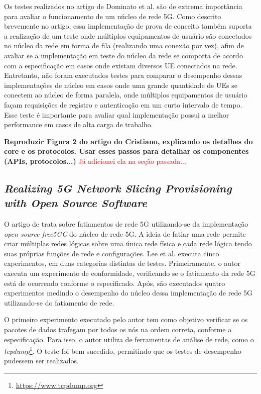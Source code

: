 Os testes realizados no artigo de Dominato et al. são de extrema importância para avaliar o funcionamento de um núcleo de rede 5G.
Como descrito brevemente no artigo, essa implementação de prova de conceito também suporta a realização de um teste onde múltiplos equipamentos de usuário são conectados no núcleo da rede em forma de fila (realizando uma conexão por vez), afim de avaliar se a implementação em teste do núcleo da rede se comporta de acordo com a especificação em casos onde existam diversos UE conectados na rede.
Entretanto, não foram executados testes para comparar o desempenho dessas implementações de núcleo em casos onde uma grande quantidade de UEs se conectem ao núcleo de forma paralela, onde múltiplos equipamentos de usuário façam requisições de registro e autenticação em um curto intervalo de tempo.
Esse teste é importante para avaliar qual implementação possui a melhor performance em casos de alta carga de trabalho.


\textbf{Reproduzir Figura 2 do artigo do Cristiano, explicando os detalhes do core e os protocolos. Usar esses passos para detalhar os componentes (APIs, protocolos...)} \textcolor{red}{Já adicionei ela na seção passada...}

\subsection{\textit{Realizing 5G Network Slicing Provisioning with Open Source Software}}

O artigo de \cite{Lee2021} trata sobre fatiamentos de rede 5G utilizando-se da implementação \textit{open source free5GC} do núcleo de rede 5G.
A ideia de fatiar uma rede permite criar múltiplas redes lógicas sobre uma única rede física e cada rede lógica tendo suas próprias funções de rede e configurações.
Lee et al. executa cinco experimentos, em duas categorias distintas de testes. Primeiramente, o autor executa um experimento de conformidade, verificando se o fatiamento da rede 5G está de ocorrendo conforme o especificado. Após, são executados quatro experimentos medindo o desempenho do núcleo dessa implementação de rede 5G utilizando-se do fatiamento de rede.

O primeiro experimento executado pelo autor tem como objetivo verificar se os pacotes de dados trafegam por todos os nós na ordem correta, conforme a especificação.
Para isso, o autor utiliza de ferramentas de análise de rede, como o \textit{tcpdump}\footnote{\url{https://www.tcpdump.org}}.
O teste foi bem sucedido, permitindo que os testes de desempenho pudessem ser realizados.

